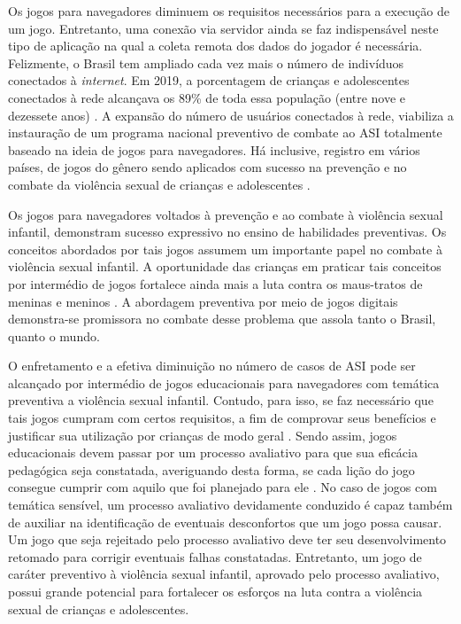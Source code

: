 Os jogos para navegadores diminuem os requisitos necessários para a execução de um jogo. Entretanto, uma conexão via servidor ainda se faz indispensável neste tipo de aplicação na qual a coleta remota dos dados do jogador é necessária. Felizmente, o Brasil tem ampliado cada vez mais o número de indivíduos conectados à \textit{internet}. Em 2019, a porcentagem de crianças e adolescentes conectados à rede alcançava os 89\% de toda essa população (entre nove e dezessete anos) \cite{nic2019pesquisa}. A expansão do número de usuários conectados à rede, viabiliza a instauração de um programa nacional preventivo de combate ao \ac{ASI} totalmente baseado na ideia de jogos para navegadores. Há inclusive, registro em vários países, de jogos do gênero sendo aplicados com sucesso na prevenção e no combate da violência sexual de crianças e adolescentes \cite{jones2008online, fingerle2018abschlussbericht}. 

Os jogos para navegadores voltados à prevenção e ao combate à violência sexual infantil, demonstram sucesso expressivo no ensino de habilidades preventivas. Os conceitos abordados por tais jogos assumem um importante papel no combate à violência sexual infantil. A oportunidade das crianças em praticar tais conceitos por intermédio de jogos fortalece ainda mais a luta contra os maus-tratos de meninas e meninos \cite{collin2013lessons}. A abordagem preventiva por meio de jogos digitais demonstra-se promissora no combate desse problema que assola tanto o Brasil, quanto o mundo. 

O enfretamento e a efetiva diminuição no número de casos de \ac{ASI} pode ser alcançado por intermédio de jogos educacionais para navegadores com temática preventiva a violência sexual infantil. Contudo, para isso, se faz necessário que tais jogos cumpram com certos requisitos, a fim de comprovar seus benefícios e justificar sua utilização por crianças de modo geral \cite{campos1996dez}. Sendo assim, jogos educacionais devem passar por um processo avaliativo para que sua eficácia pedagógica seja constatada, averiguando desta forma, se cada lição do jogo consegue cumprir com aquilo que foi planejado para ele \cite{montilva2002method, padron2007towards}. No caso de jogos com temática sensível, um processo avaliativo devidamente conduzido é capaz também de auxiliar na identificação de eventuais desconfortos que um jogo possa causar. Um jogo que seja rejeitado pelo processo avaliativo deve ter seu desenvolvimento retomado para corrigir eventuais falhas constatadas. Entretanto, um jogo de caráter preventivo à violência sexual infantil, aprovado pelo processo avaliativo, possui grande potencial para fortalecer os esforços na luta contra a violência sexual de crianças e adolescentes. 

